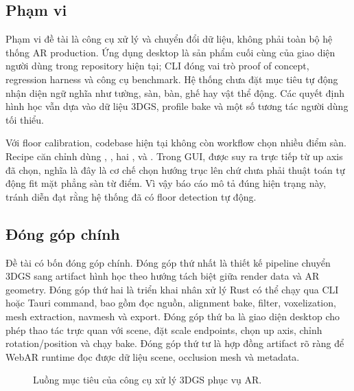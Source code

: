 \subsection{Phạm vi}

Phạm vi đề tài là công cụ xử lý và chuyển đổi dữ liệu, không phải toàn bộ hệ thống AR production. Ứng dụng desktop là sản phẩm cuối cùng của giao diện người dùng trong repository hiện tại; CLI đóng vai trò proof of concept, regression harness và công cụ benchmark. Hệ thống chưa đặt mục tiêu tự động nhận diện ngữ nghĩa như tường, sàn, bàn, ghế hay vật thể động. Các quyết định hình học vẫn dựa vào dữ liệu 3DGS, profile bake và một số tương tác người dùng tối thiểu.

Với floor calibration, codebase hiện tại không còn workflow chọn nhiều điểm sàn. Recipe căn chỉnh dùng , , hai ,  và . Trong GUI,  được suy ra trực tiếp từ up axis đã chọn, nghĩa là đây là cơ chế chọn hướng trục lên chứ chưa phải thuật toán tự động fit mặt phẳng sàn từ điểm. Vì vậy báo cáo mô tả đúng hiện trạng này, tránh diễn đạt rằng hệ thống đã có floor detection tự động.

\subsection{Đóng góp chính}

Đề tài có bốn đóng góp chính. Đóng góp thứ nhất là thiết kế pipeline chuyển 3DGS sang artifact hình học theo hướng tách biệt giữa render data và AR geometry. Đóng góp thứ hai là triển khai nhân xử lý Rust có thể chạy qua CLI hoặc Tauri command, bao gồm đọc nguồn, alignment bake, filter, voxelization, mesh extraction, navmesh và export. Đóng góp thứ ba là giao diện desktop cho phép thao tác trực quan với scene, đặt scale endpoints, chọn up axis, chỉnh rotation/position và chạy bake. Đóng góp thứ tư là hợp đồng artifact rõ ràng để WebAR runtime đọc được dữ liệu scene, occlusion mesh và metadata.

\begin{figure}[H]
\centering
{}
\caption{Luồng mục tiêu của công cụ xử lý 3DGS phục vụ AR.}
\end{figure}

